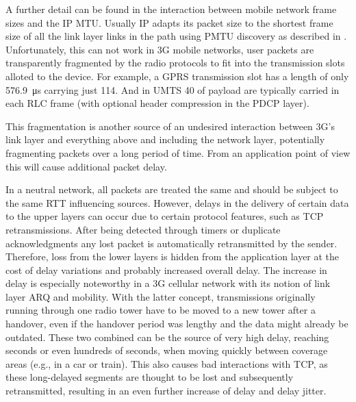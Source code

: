 A further detail can be found in the interaction between mobile network frame sizes and the \gls{IP} \gls{MTU}. Usually \gls{IP} adapts its packet size to the shortest frame size of all the link layer links in the path using \gls{PMTU} discovery as described in \cite{rfc1191}. Unfortunately, this can not work in \gls{3G} mobile networks, user packets are transparently fragmented by the radio protocols to fit into the transmission slots alloted to the device. For example, a \gls{GPRS} transmission slot has a length of only \SI{576.9}{\micro\second} carrying just \SI{114}{\bit}. And in \gls{UMTS} \SI{40}{\byte} of payload are typically carried in each \gls{RLC} frame (with optional header compression in the \gls{PDCP} layer).

This fragmentation is another source of an undesired interaction between \gls{3G}'s link layer and everything above and including the network layer, potentially fragmenting packets over a long period of time. From an application point of view this will cause additional packet delay.

In a neutral network, all packets are treated the same and should be subject to the same \gls{RTT} influencing sources. However, delays in the delivery of certain data to the upper layers can occur due to certain protocol features, such as \gls{TCP} retransmissions. After being detected through timers or duplicate acknowledgments any lost packet is automatically retransmitted by the sender. Therefore, loss from the lower layers is hidden from the application layer at the cost of delay variations and probably increased overall delay. The increase in delay is especially noteworthy in a \gls{3G} cellular network with its notion of link layer \gls{ARQ} and mobility. With the latter concept, transmissions originally running through one radio tower have to be moved to a new tower after a handover, even if the handover period was lengthy and the data might already be outdated. These two combined can be the source of very high delay, reaching seconds or even hundreds of seconds, when moving quickly between coverage areas (e.g., in a car or train). 
This also causes bad interactions with \gls{TCP}, as these long-delayed segments are thought to be lost and subsequently retransmitted, resulting in an even further increase of delay and delay jitter.

